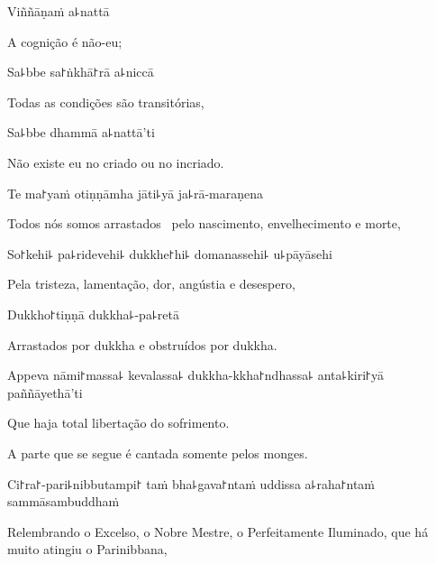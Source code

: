 Viññāṇaṁ a꜕nattā

\begin{english}
  A cognição é não-eu;
\end{english}

Sa꜕bbe sa꜓ṅkhā꜓rā a꜕niccā

\begin{english}
  Todas as condições são transitórias,
\end{english}

Sa꜕bbe dhammā a꜕nattā'ti

\begin{english}
  Não existe eu no criado ou no incriado.
\end{english}

\clearpage

Te ma꜓yaṁ otiṇṇāmha jāti꜕yā ja꜕rā-maraṇena

\begin{english}
  Todos nós somos arrastados \pause\ pelo nascimento, envelhecimento e morte,
\end{english}

So꜓kehi꜕ pa꜕ridevehi꜕ dukkhe꜓hi꜕ domanassehi꜕ u꜕pāyāsehi

\begin{english}
  Pela tristeza, lamentação, dor, angústia e desespero,
\end{english}

Dukkho꜓tiṇṇā dukkha꜕-pa꜕retā

\begin{english}
  Arrastados por dukkha e obstruídos por dukkha.
\end{english}

Appeva nāmi꜓massa꜕ kevalassa꜕ dukkha-kkha꜓ndhassa꜕ anta꜕kiri꜓yā \\paññāyethā'ti

\begin{english}
  Que haja total libertação do sofrimento.
\end{english}

\begin{instruction}
  A parte que se segue é cantada somente pelos monges.
\end{instruction}

Ci꜓ra꜓-pari꜕nibbutampi꜓ taṁ bha꜕gava꜓ntaṁ uddissa a꜕raha꜓ntaṁ sammāsambuddhaṁ

\begin{english}
  Relembrando o Excelso, o Nobre Mestre, o Perfeitamente Iluminado, que há muito atingiu o Parinibbana,
\end{english}

